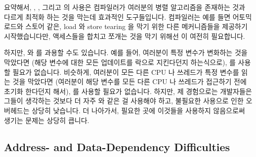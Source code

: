 요약해서, , , 그리고  의 사용은
컴파일러가 여러분의 병렬 알고리즘을 존재하는 것과 다르게 최적화 하는 것을
막는데 효과적인 도구들입니다.
컴파일러는 예를 들면  어토믹 로드와 스토어 같은, load
와 store tearing 을 막기 위한 다른 메커니즘들을 제공하기 시작했습니다만,
액세스들을 합치고 쪼개는 것을 막기 위해선  이 여전히 필요합니다.

하지만,  와  를 과용할 수도 있습니다.
예를 들어, 여러분이 특정 변수가 변화하는 것을 막았다면 (해당 변수에 대한 모든
업데이트를 락으로 지킨다던지 하는식으로),  를 사용할 필요가
없습니다.
비슷하게, 여러분이 모든 다른 CPU 나 쓰레드가 특정 변수를 읽는 것을 막았다면
(여러분이 해당 변수를 모든 다른 CPU 나 쓰레드가 접근하기 전에 초기화 한다던지
해서),  를 사용할 필요가 없습니다.
하지만, 제 경험으로는 개발자들은 그들이 생각하는 것보다 더 자주
 와  같은 걸 사용해야 하고, 불필요한 사용으로
인한 오버헤드는 상당히 낮습니다.
더 나아가서, 필요한 곳에 이것들을 사용하지 않음으로써 생기는 문제는 상당히
큽니다.

\subsection{Address- and Data-Dependency Difficulties}
\label{sec:memorder:Address- and Data-Dependency Difficulties}

